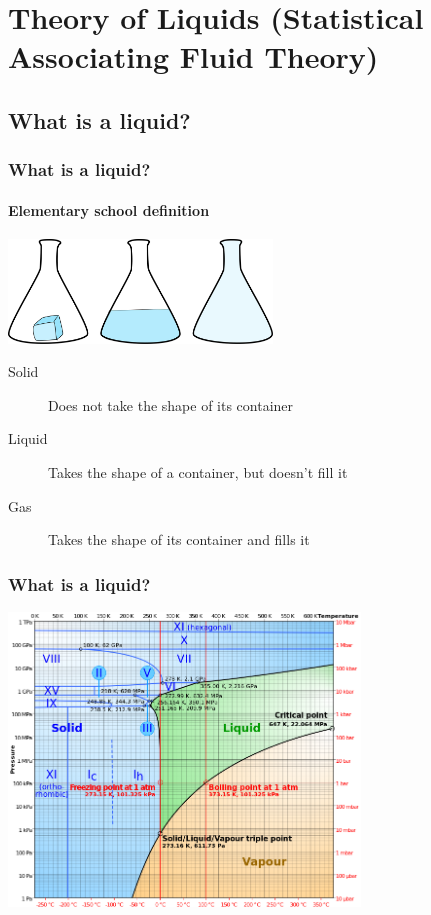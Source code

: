 \section{Theory of Liquids (Statistical Associating Fluid Theory)}
\subsection*{What is a liquid?}
\begin{frame}
  \frametitle{What is a liquid?}
  \framesubtitle{Elementary school definition}
  \begin{center}
    \includegraphics[width=7cm]{figs/solid-liquid-gas}
  \end{center}
  \begin{description}
  \item[Solid] Does not take the shape of its container
  \item[Liquid] Takes the shape of a container, but doesn't fill it
  \item[Gas] Takes the shape of its container and fills it
  \end{description}
\end{frame}

\begin{frame}
  \frametitle{What is a liquid?}
  \begin{center}
    \includegraphics[height=7.8cm]{figs/water-phase-diagram}
  \end{center}
\end{frame}

